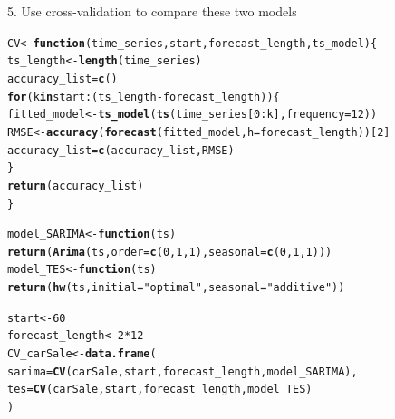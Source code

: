 \documentclass[10pt]{article}\usepackage[]{graphicx}\usepackage[]{color}
\makeatletter
\newcommand{\hlnum}[1]{\textcolor[rgb]{0.686,0.059,0.569}{#1}}%
\newcommand{\hlstr}[1]{\textcolor[rgb]{0.192,0.494,0.8}{#1}}%
\newcommand{\hlopt}[1]{\textcolor[rgb]{0,0,0}{#1}}%
\newcommand{\hlstd}[1]{\textcolor[rgb]{0.345,0.345,0.345}{#1}}%
\newcommand{\hlkwa}[1]{\textcolor[rgb]{0.161,0.373,0.58}{\textbf{#1}}}%
\newcommand{\hlkwb}[1]{\textcolor[rgb]{0.69,0.353,0.396}{#1}}%
\newcommand{\hlkwc}[1]{\textcolor[rgb]{0.333,0.667,0.333}{#1}}%
\newcommand{\hlkwd}[1]{\textcolor[rgb]{0.737,0.353,0.396}{\textbf{#1}}}%
\newenvironment{kframe}{%
 \def\at@end@of@kframe{}%
 \ifinner\ifhmode%
  \def\at@end@of@kframe{\end{minipage}}%
  \begin{minipage}{\columnwidth}%
 \fi\fi%
 \def\FrameCommand##1{\hskip\@totalleftmargin \hskip-\fboxsep
 \colorbox{shadecolor}{##1}\hskip-\fboxsep
     \hskip-\linewidth \hskip-\@totalleftmargin \hskip\columnwidth}%
 \MakeFramed {\advance\hsize-\width
   \@totalleftmargin\z@ \linewidth\hsize
   \@setminipage}}%
 {\par\unskip\endMakeFramed%
 \at@end@of@kframe}
\newenvironment{knitrout}{}{} %
\makeatother
\begin{document}
5. Use cross-validation to compare these two models
\begin{knitrout}
\color{fgcolor}\begin{kframe}
\begin{alltt}
\hlstd{CV} \hlkwb{<-}  \hlkwa{function}\hlstd{(}\hlkwc{time_series}\hlstd{,} \hlkwc{start}\hlstd{,} \hlkwc{forecast_length}\hlstd{,}\hlkwc{ts_model}\hlstd{)\{}
  \hlstd{ts_length} \hlkwb{<-}  \hlkwd{length}\hlstd{(time_series)}
  \hlstd{accuracy_list} \hlkwb{=} \hlkwd{c}\hlstd{()}
  \hlkwa{for}\hlstd{(k} \hlkwa{in} \hlstd{start}\hlopt{:}\hlstd{(ts_length} \hlopt{-} \hlstd{forecast_length))\{}
    \hlstd{fitted_model} \hlkwb{<-} \hlkwd{ts_model}\hlstd{(}\hlkwd{ts}\hlstd{(time_series[}\hlnum{0}\hlopt{:}\hlstd{k],}\hlkwc{frequency} \hlstd{=} \hlnum{12}\hlstd{))}
    \hlstd{RMSE} \hlkwb{<-}  \hlkwd{accuracy}\hlstd{(}\hlkwd{forecast}\hlstd{(fitted_model,} \hlkwc{h} \hlstd{= forecast_length))[}\hlnum{2}\hlstd{]}
    \hlstd{accuracy_list} \hlkwb{=} \hlkwd{c}\hlstd{(accuracy_list, RMSE)}
  \hlstd{\}}
  \hlkwd{return}\hlstd{(accuracy_list)}
\hlstd{\}}

\hlstd{model_SARIMA} \hlkwb{<-} \hlkwa{function}\hlstd{(}\hlkwc{ts}\hlstd{)}
  \hlkwd{return}\hlstd{(}\hlkwd{Arima}\hlstd{(ts,} \hlkwc{order} \hlstd{=} \hlkwd{c}\hlstd{(}\hlnum{0}\hlstd{,}\hlnum{1}\hlstd{,}\hlnum{1}\hlstd{),} \hlkwc{seasonal} \hlstd{=} \hlkwd{c}\hlstd{(}\hlnum{0}\hlstd{,}\hlnum{1}\hlstd{,}\hlnum{1}\hlstd{)))}
\hlstd{model_TES} \hlkwb{<-} \hlkwa{function}\hlstd{(}\hlkwc{ts}\hlstd{)}
  \hlkwd{return}\hlstd{(}\hlkwd{hw}\hlstd{(ts,}\hlkwc{initial} \hlstd{=} \hlstr{"optimal"}\hlstd{,} \hlkwc{seasonal} \hlstd{=} \hlstr{"additive"}\hlstd{))}

\hlstd{start} \hlkwb{<-} \hlnum{60}
\hlstd{forecast_length} \hlkwb{<-} \hlnum{2}\hlopt{*}\hlnum{12}
\hlstd{CV_carSale} \hlkwb{<-} \hlkwd{data.frame}\hlstd{(}
  \hlkwc{sarima} \hlstd{=} \hlkwd{CV}\hlstd{(carSale, start, forecast_length, model_SARIMA),}
  \hlkwc{tes} \hlstd{=} \hlkwd{CV}\hlstd{(carSale, start, forecast_length, model_TES)}
\hlstd{)}


\end{alltt}
\end{kframe}
\end{knitrout}
\end{document}
